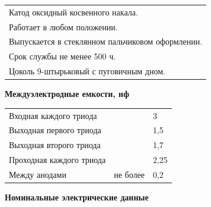 \documentclass[12pt]{article}
\makeatletter
\renewcommand \dotfill {\leavevmode \cleaders \hb@xt@ 5mm{\hss .\hss }\hfill \kern \z@}
\makeatother
\begin{document}
    \vspace{70mm}
    
    
    \begin{tabular}{l@{}}
        Катод оксидный косвенного накала. \\
        Работает в любом положении. \\
        Выпускается в стеклянном пальчиковом оформлении. \\
        Срок службы не менее 500 ч. \\
        Цоколь 9-штырьковый с пуговичным дном. \\
    \end{tabular}
    
    \vspace{3mm}
    \hspace{-7mm} \textbf{Междуэлектродные емкости, нф}
    \vspace{3mm}
    
    \begin{tabular}{p{105mm}l@{}l}
        Входная каждого триода \hspace{0.1mm} \dotfill & & 3 \\
        Выходная первого триода \dotfill & & 1,5 \\
        Выходная второго триода \dotfill & & 1,7 \\
        Проходная каждого триода \hspace{0.5mm} \dotfill & & 2,25 \\
        Между анодами \hspace{-3.1mm} \dotfill & \hspace{-7mm} не более \hspace{1mm} & 0,2 \\
    \end{tabular}
    
    \vspace{3mm}
    \hspace{-7mm} \textbf{Номинальные электрические данные}
    \vspace{3mm}
    
\end{document}
